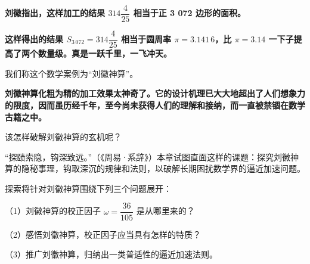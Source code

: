 \documentclass[
  10pt,
  fontset=fandol]{ctexart}
\begin{document}
\textbf{刘徽指出，这样加工的结果 \(314\dfrac{4}{25}\) 相当于正 3 072 边形的面积。}

\textbf{这样得出的结果 \(S_{3\,072}=314\dfrac{4}{25}\) 相当于圆周率 \(\pi=3.141\,6\)，比 \(\pi=3.14\) 一下子提高了两个数量级。真是一跃千里，一飞冲天。}

我们称这个数学案例为``刘徽神算''。

\textbf{刘徽神算化粗为精的加工效果太神奇了。它的设计机理已大大地超出了人们想象力的限度，因而虽历经千年，至今尚未获得人们的理解和接纳，而一直被禁锢在数学古籍之中。}

该怎样破解刘徽神算的玄机呢？

``探赜索隐，钩深致远。''（《周易·系辞》）本章试图直面这样的课题：探究刘徽神算的隐秘事理，钩取深沉的规律和法则，以破解长期困扰数学界的逼近加速问题。

探索将针对刘徽神算围绕下列三个问题展开：

（1）刘徽神算的校正因子 \(\omega=\dfrac{36}{105}\) 是从哪里来的？

（2）感悟刘徽神算，校正因子应当具有怎样的特质？

（3）推广刘徽神算，归纳出一类普适性的逼近加速法则。
\end{document}
